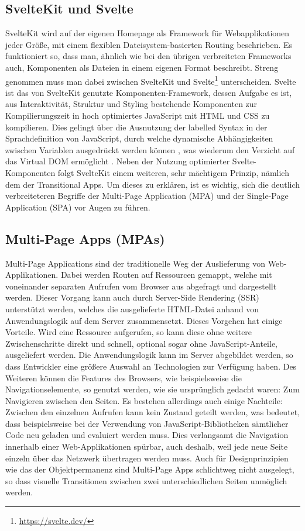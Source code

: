 \subsection{SvelteKit und Svelte}
SvelteKit wird auf der eigenen Homepage als Framework für Webapplikationen jeder Größe, mit einem flexiblen Dateisystem-basierten Routing beschrieben. Es funktioniert so, dass man, ähnlich wie bei den übrigen verbreiteten Frameworks auch, Komponenten als Dateien in einem eigenen Format beschreibt. Streng genommen muss man dabei zwischen SvelteKit und Svelte\footnote{\url{https://svelte.dev/}} unterscheiden. Svelte ist das von SvelteKit genutzte Komponenten-Framework, dessen Aufgabe es ist, aus Interaktivität, Struktur und Styling bestehende Komponenten zur Kompilierungszeit in hoch optimiertes JavaScript mit HTML und CSS zu kompilieren. Dies gelingt über die Ausnutzung der labelled Syntax in der Sprachdefinition von JavaScript, durch welche dynamische Abhängigkeiten zwischen Variablen ausgedrückt werden können \cite[vgl.][]{svelteReactive}, was wiederum den Verzicht auf das Virtual DOM ermöglicht \cite[vgl.][]{Harris2018}. Neben der Nutzung optimierter Svelte-Komponenten folgt SvelteKit einem weiteren, sehr mächtigem Prinzip, nämlich dem der Transitional Apps. Um dieses zu erklären, ist es wichtig, sich die deutlich verbreiteteren Begriffe der Multi-Page Application (MPA) und der Single-Page Application (SPA) vor Augen zu führen.
\subsection{Multi-Page Apps (MPAs)}
Multi-Page Applications sind der traditionelle Weg der Auslieferung von Web-Applikationen. Dabei werden Routen auf Ressourcen gemappt, welche mit voneinander separaten Aufrufen vom Browser aus abgefragt und dargestellt werden. Dieser Vorgang kann auch durch Server-Side Rendering (SSR) unterstützt werden, welches die ausgelieferte HTML-Datei anhand von Anwendungslogik auf dem Server zusammensetzt. Dieses Vorgehen hat einige Vorteile. Wird eine Ressource aufgerufen, so kann diese ohne weitere Zwischenschritte direkt und schnell, optional sogar ohne JavaScript-Anteile, ausgeliefert werden. Die Anwendungslogik kann im Server abgebildet werden, so dass Entwickler eine größere Auswahl an Technologien zur Verfügung haben. Des Weiteren können die Features des Browsers, wie beispielsweise die Navigationselemente, so genutzt werden, wie sie ursprünglich gedacht waren: Zum Navigieren zwischen den Seiten. Es bestehen allerdings auch einige Nachteile: Zwischen den einzelnen Aufrufen kann kein Zustand geteilt werden, was bedeutet, dass beispielsweise bei der Verwendung von JavaScript-Bibliotheken sämtlicher Code neu geladen und evaluiert werden muss. Dies verlangsamt die Navigation innerhalb einer Web-Applikationen spürbar, auch deshalb, weil jede neue Seite einzeln über das Netzwerk übertragen werden muss. Auch für Designprinzipien wie das der Objektpermanenz sind Multi-Page Apps schlichtweg nicht ausgelegt, so dass visuelle Transitionen zwischen zwei unterschiedlichen Seiten unmöglich werden.
